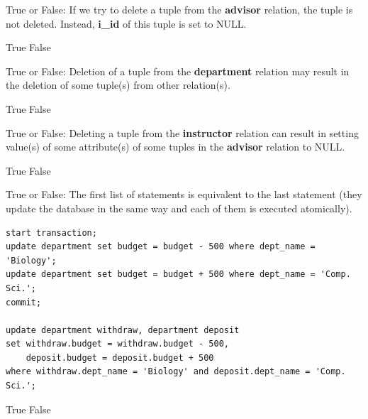 \documentclass[12pt, addpoints, answers]{exam}
\begin{document}
\begin{questions}
\begin{minipage}{\linewidth}
\question[2]
True or False: If we try to delete a tuple from the \textbf{advisor} relation, the tuple is not deleted. Instead, \textbf{i\_id} of this tuple is set to NULL.\par\vspace{0.5em}
\begin{checkboxes}
    \choice True
    \CorrectChoice False
\end{checkboxes}
\end{minipage}\vspace{1em}

\begin{minipage}{\linewidth}
\question[2]
True or False: Deletion of a tuple from the \textbf{department} relation may result in the deletion of some tuple(s) from other relation(s).\par\vspace{0.5em}
\begin{checkboxes}
    \choice True
    \CorrectChoice False
\end{checkboxes}
\end{minipage}\vspace{1em}

\begin{minipage}{\linewidth}
\question[2]
True or False: Deleting a tuple from the \textbf{instructor} relation can result in setting value(s) of some attribute(s) 
of some tuples in the \textbf{advisor} relation to NULL.\par\vspace{0.5em}
\begin{checkboxes}
    \CorrectChoice True
    \choice False
\end{checkboxes}
\end{minipage}\vspace{1em}

\begin{minipage}{\linewidth}
\question[3]
True or False: The first list of statements is equivalent to the last statement 
(they update the database in the same way and each of them is executed atomically).\par
\begin{verbatim}
start transaction;
update department set budget = budget - 500 where dept_name = 'Biology';
update department set budget = budget + 500 where dept_name = 'Comp. Sci.';
commit;

update department withdraw, department deposit
set withdraw.budget = withdraw.budget - 500,
    deposit.budget = deposit.budget + 500
where withdraw.dept_name = 'Biology' and deposit.dept_name = 'Comp. Sci.';
\end{verbatim}
\begin{checkboxes}
    \CorrectChoice True
    \choice False
\end{checkboxes}
\end{minipage}\vspace{1em}


\end{questions}
\end{document}
